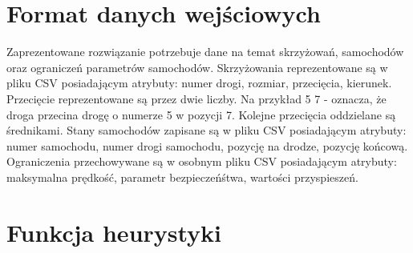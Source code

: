 \section{Format danych wejściowych}

Zaprezentowane rozwiązanie potrzebuje dane na temat skrzyżowań, samochodów oraz ograniczeń parametrów samochodów.
\newline
\newline
Skrzyżowania reprezentowane są w pliku CSV posiadającym atrybuty: numer drogi, rozmiar, przecięcia, kierunek. Przecięcie reprezentowane są przez dwie liczby. Na przykład 5 7 - oznacza, że droga przecina drogę o numerze 5 w pozycji 7. Kolejne przecięcia oddzielane są średnikami.
\newline
\newline
Stany samochodów zapisane są w pliku CSV posiadającym atrybuty: numer samochodu, numer drogi samochodu, pozycję na drodze, pozycję końcową.
\newline
\newline
Ograniczenia przechowywane są w osobnym pliku CSV posiadającym atrybuty: maksymalna prędkość, parametr bezpieczeńśtwa, wartości przyspieszeń.

\section{Funkcja heurystyki}

